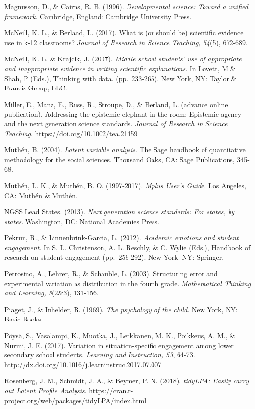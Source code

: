 \documentclass[]{msu-thesis}
\theoremstyle{definition}
\theoremstyle{definition}
\theoremstyle{definition}
\theoremstyle{remark}
\begin{document}
Magnusson, D., \& Cairns, R. B. (1996). \emph{Developmental science:
Toward a unified framework}. Cambridge, England: Cambridge University
Press.

McNeill, K. L., \& Berland, L. (2017). What is (or should be) scientific
evidence use in k‐12 classrooms? \emph{Journal of Research in Science
Teaching, 54}(5), 672-689.

McNeill, K. L. \& Krajcik, J. (2007). \emph{Middle school students' use
of appropriate and inappropriate evidence in writing scientific
explanations}. In Lovett, M \& Shah, P (Eds.), Thinking with data.
(pp.~233-265). New York, NY: Taylor \& Francis Group, LLC.

Miller, E., Manz, E., Russ, R., Stroupe, D., \& Berland, L. (advance
online publication). Addressing the epistemic elephant in the room:
Epistemic agency and the next generation science standards.
\emph{Journal of Research in Science Teaching}.
\url{https://doi.org/10.1002/tea.21459}

Muthén, B. (2004). \emph{Latent variable analysis}. The Sage handbook of
quantitative methodology for the social sciences. Thousand Oaks, CA:
Sage Publications, 345-68.

Muthén, L. K., \& Muthén, B. O. (1997-2017). \emph{Mplus User's Guid}e.
Los Angeles, CA: Muthén \& Muthén.

NGSS Lead States. (2013). \emph{Next generation science standards: For
states, by states}. Washington, DC: National Academies Press.

Pekrun, R., \& Linnenbrink-Garcia, L. (2012). \emph{Academic emotions
and student engagement}. In S. L. Christenson, A. L. Reschly, \& C.
Wylie (Eds.), Handbook of research on student engagement (pp.~259-292).
New York, NY: Springer.

Petrosino, A., Lehrer, R., \& Schauble, L. (2003). Structuring error and
experimental variation as distribution in the fourth grade.
\emph{Mathematical Thinking and Learning, 5}(2\&3), 131-156.

Piaget, J., \& Inhelder, B. (1969). \emph{The psychology of the child}.
New York, NY: Basic Books.

Pöysä, S., Vasalampi, K., Muotka, J., Lerkkanen, M. K., Poikkeus, A. M.,
\& Nurmi, J. E. (2017). Variation in situation-specific engagement among
lower secondary school students. \emph{Learning and Instruction, 53},
64-73. \url{http://dx.doi.org/10.1016/j.learninstruc.2017.07.007}

Rosenberg, J. M., Schmidt, J. A., \& Beymer, P. N. (2018).
\emph{tidyLPA: Easily carry out Latent Profile Analysis}.
\url{https://cran.r-project.org/web/packages/tidyLPA/index.html}
\end{document}

